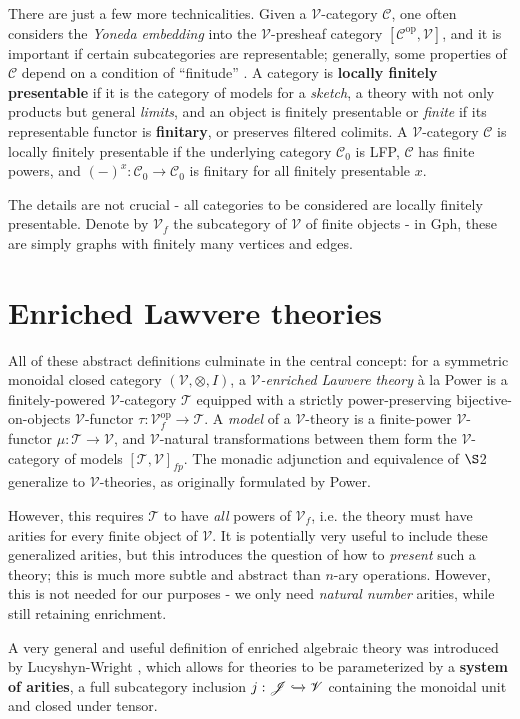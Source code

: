 \documentclass[a4paper,UKenglish]{article}
\theoremstyle{definition}
\newcommand{\Gph}{\mathrm{Gph}}
\newcommand{\op}{\mathrm{op}}
\newcommand{\V}{\mathscr{V}}
\newcommand{\C}{\mathscr{C}}
\newcommand{\J}{\mathscr{J}}
\newcommand{\T}{\mathscr{T}}
\begin{document}
There are just a few more technicalities. Given a $\V$-category $\C$, one often considers the \textit{Yoneda embedding} into the $\V$-presheaf category $[\C^\op, \V]$, and it is important if certain subcategories are representable; generally, some properties of $\C$ depend on a condition of ``finitude'' \cite{finite}. A category is \textbf{locally finitely presentable} if it is the category of models for a \textit{sketch}, a theory with not only products but general \textit{limits}, and an object is finitely presentable or \textit{finite} if its representable functor is \textbf{finitary}, or preserves filtered colimits. A $\V$-category $\C$ is locally finitely presentable if the underlying category $\C_0$ is LFP, $\C$ has finite powers, and $(-)^x: \C_0 \to \C_0$ is finitary for all finitely presentable $x$.

The details are not crucial - all categories to be considered are locally finitely presentable. Denote by $\V_f$ the subcategory of $\V$ of finite objects - in $\Gph$, these are simply graphs with finitely many vertices and edges.

\section{Enriched Lawvere theories}
All of these abstract definitions culminate in the central concept: for a symmetric monoidal closed category $(\V,\otimes,I)$, a \textit{$\V$-enriched Lawvere theory} \`a la Power \cite{power} is a finitely-powered $\V$-category $\T$ equipped with a strictly power-preserving bijective-on-objects $\V$-functor $\tau:\V_f^\op \to \T$. A \textit{model} of a $\V$-theory is a finite-power $\V$-functor $\mu:\T \to \V$, and $\V$-natural transformations between them form the $\V$-category of models $[\T,\V]_{fp}$. The monadic adjunction and equivalence of $\S$2 generalize to $\V$-theories, as originally formulated by Power.

However, this requires $\T$ to have \textit{all} powers of $\V_f$, i.e. the theory must have arities for every finite object of $\V$. It is potentially very useful to include these generalized arities, but this introduces the question of how to \textit{present} such a theory; this is much more subtle and abstract than $n$-ary operations. However, this is not needed for our purposes - we only need \textit{natural number} arities, while still retaining enrichment.

A very general and useful definition of enriched algebraic theory was introduced by Lucyshyn-Wright \cite{rbb}, which allows for theories to be parameterized by a \textbf{system of arities}, a full subcategory inclusion $j: \J \xhookrightarrow{} \V$ containing the monoidal unit and closed under tensor.
\end{document}
